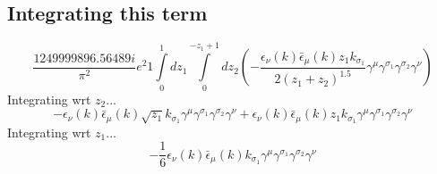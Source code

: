 \subsection*{Integrating this term}
\begin{dmath}\frac{1249999896.56489 i}{\pi^{2}} e^{2}1\int\limits_{ 0 }^{ 1 } d{ z_{ 1 } }\int\limits_{ 0 }^{ - { z_{ 1 } } + 1 } d{ z_{ 2 } }\left(- \frac{\epsilon_{ \nu }({ k }) \bar{\epsilon}_{ \mu }({ k }) { z_{ 1 } } { { k }_{ \sigma_1 } }}{2 \left({ z_{ 1 } } + { z_{ 2 } }\right)^{1.5}} { \gamma^{ \mu } } { \gamma^{ \sigma_1 } } { \gamma^{ \sigma_2 } } { \gamma^{ \nu } }\right)\end{dmath}
Integrating wrt ${ z_{ 2 } }$...
\begin{dmath}- \epsilon_{ \nu }({ k }) \bar{\epsilon}_{ \mu }({ k }) \sqrt{{ z_{ 1 } }} { { k }_{ \sigma_1 } } { \gamma^{ \mu } } { \gamma^{ \sigma_1 } } { \gamma^{ \sigma_2 } } { \gamma^{ \nu } } + \epsilon_{ \nu }({ k }) \bar{\epsilon}_{ \mu }({ k }) { z_{ 1 } } { { k }_{ \sigma_1 } } { \gamma^{ \mu } } { \gamma^{ \sigma_1 } } { \gamma^{ \sigma_2 } } { \gamma^{ \nu } }\end{dmath}
Integrating wrt ${ z_{ 1 } }$...
\begin{dmath}- \frac{1}{6} \epsilon_{ \nu }({ k }) \bar{\epsilon}_{ \mu }({ k }) { { k }_{ \sigma_1 } } { \gamma^{ \mu } } { \gamma^{ \sigma_1 } } { \gamma^{ \sigma_2 } } { \gamma^{ \nu } }\end{dmath}
